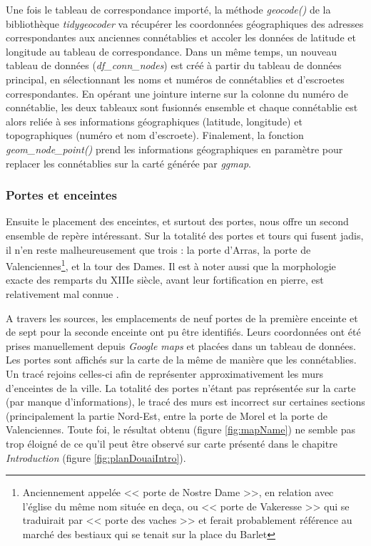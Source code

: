Une fois le tableau de correspondance importé, la méthode \textit{geocode()} de la bibliothèque \textit{tidygeocoder} va récupérer les coordonnées géographiques des adresses correspondantes aux anciennes connétablies et accoler les données de latitude et longitude  au tableau de correspondance.
Dans un même temps, un nouveau tableau de données (\textit{df\_conn\_nodes}) est créé à partir du tableau de données principal, en sélectionnant les noms et numéros de connétablies et d'escroetes correspondantes. En opérant une jointure interne sur la colonne du numéro de connétablie, les deux tableaux sont fusionnés ensemble et chaque connétablie est alors reliée à ses informations géographiques (latitude, longitude) et topographiques (numéro et nom d'escroete). Finalement, la fonction \textit{geom\_node\_point()} prend les informations géographiques en paramètre pour replacer les connétablies sur la carté générée par \textit{ggmap}. 


\subsubsection{Portes et enceintes}
Ensuite le placement des enceintes, et surtout des portes,  nous offre un second ensemble de repère intéressant.
Sur la totalité des portes et tours qui fusent jadis, il n'en reste malheureusement que trois :  la porte d'Arras, la porte de Valenciennes\footnote{Anciennement appelée << porte de Nostre Dame >>, en relation avec l'église du même nom située en deça, ou  << porte de Vakeresse >> qui se traduirait par << porte des vaches >>\parencite{demolon_service_1999} et ferait probablement référence au marché des bestiaux qui se tenait sur la place du Barlet}, et la tour des Dames.  Il est à noter aussi que la morphologie exacte des remparts du XIIIe siècle, avant leur fortification en pierre, est relativement mal connue \parencite{demolon_douai_1990}. 

A travers les sources,  les emplacements de neuf portes de la première enceinte et de sept pour la seconde  enceinte ont pu être identifiés. 
Leurs coordonnées  ont été prises manuellement depuis \textit{Google maps} et placées dans un tableau de données. Les portes  sont affichés sur la carte de la même de manière que les connétablies. Un tracé rejoins celles-ci afin de représenter approximativement les murs d'enceintes de la ville. La totalité des portes n'étant pas représentée sur la carte (par manque d'informations), le tracé  des murs est incorrect sur certaines sections (principalement  la partie Nord-Est, entre la porte de Morel et  la porte de Valenciennes.
Toute foi, le résultat obtenu (figure \ref{fig:mapName}) ne semble pas trop éloigné de ce qu'il peut être observé sur carte présenté dans le chapitre \textit{Introduction} (figure \ref{fig:planDouaiIntro}).

